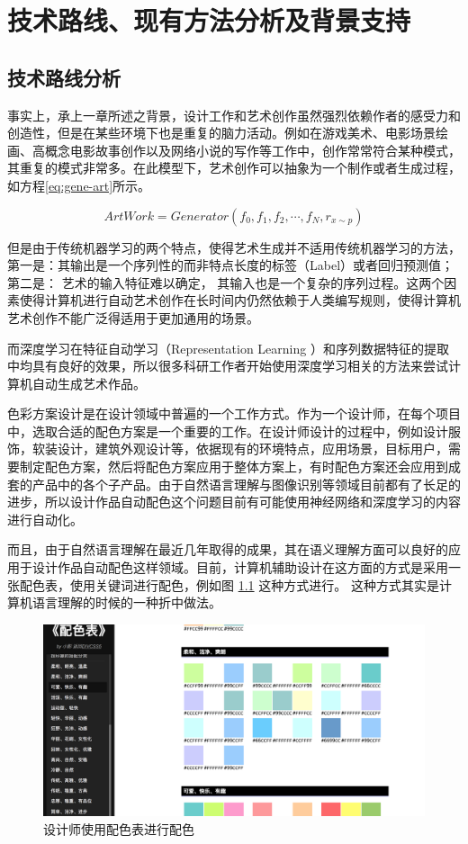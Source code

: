 \chapter{技术路线、现有方法分析及背景支持}

\section{技术路线分析}

事实上，承上一章所述之背景，设计工作和艺术创作虽然强烈依赖作者的感受力和创造性，但是在某些环境下也是重复的脑力活动。例如在游戏美术、电影场景绘画、高概念电影故事创作以及网络小说的写作等工作中，创作常常符合某种模式，其重复的模式非常多。在此模型下，艺术创作可以抽象为一个制作或者生成过程，如方程\eqref{eq:gene-art}所示。 

\begin{equation}\label{eq:gene-art}
ArtWork= Generator(f_0, f_1, f_2, \cdots, f_N, r_{x \sim p})
\end{equation} 

但是由于传统机器学习的两个特点，使得艺术生成并不适用传统机器学习的方法，第一是：其输出是一个序列性的而非特点长度的标签（Label）或者回归预测值； 第二是： 艺术的输入特征难以确定， 其输入也是一个复杂的序列过程。这两个因素使得计算机进行自动艺术创作在长时间内仍然依赖于人类编写规则，使得计算机艺术创作不能广泛得适用于更加通用的场景。 

而深度学习在特征自动学习（Representation Learning ）和序列数据特征的提取中均具有良好的效果，所以很多科研工作者开始使用深度学习相关的方法来尝试计算机自动生成艺术作品。 

色彩方案设计是在设计领域中普遍的一个工作方式。作为一个设计师，在每个项目中，选取合适的配色方案是一个重要的工作。在设计师设计的过程中，例如设计服饰，软装设计，建筑外观设计等，依据现有的环境特点，应用场景，目标用户，需要制定配色方案，然后将配色方案应用于整体方案上，有时配色方案还会应用到成套的产品中的各个子产品。由于自然语言理解与图像识别等领域目前都有了长足的进步，所以设计作品自动配色这个问题目前有可能使用神经网络和深度学习的内容进行自动化。 

而且，由于自然语言理解在最近几年取得的成果，其在语义理解方面可以良好的应用于设计作品自动配色这样领域。目前，计算机辅助设计在这方面的方式是采用一张配色表，使用关键词进行配色，例如图 \ref{img:peise} 这种方式进行。 这种方式其实是计算机语言理解的时候的一种折中做法。 

\begin{figure}[htbp]
    \centering  %
    \includegraphics[width = .55\linewidth]{data/chapter-2/peisebiao.png} %
    \caption{设计师使用配色表进行配色} %
    \label{img:peise} %
\end{figure}

